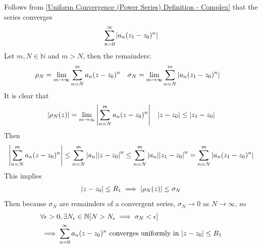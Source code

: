 \documentclass[12pt, english]{book}
\makeatletter
\renewenvironment{proof}[1][\proofname]{\par
	\pushQED{\qed}%
	\normalfont \topsep6\p@\@plus6\p@\relax
	\list{}{%
		\settowidth{\leftmargin}{\itshape\proofname:\hskip\labelsep}%
		\setlength{\labelwidth}{0pt}%
		\setlength{\itemindent}{-\leftmargin}%
	}%
	\item[\hskip\labelsep\itshape#1\@addpunct{:}]\ignorespaces
	}{ \popQED\endlist\@endpefalse}
\makeatother
\begin{document}
	\begin{figure}[H]
		\centering
	\end{figure}
	
	\begin{proof}
		Follows from \cref{Uniform Convergence (Power Series) Definition - Complex} that the series converges
		\begin{align*}
			\sum_{n=0}^{\infty} \abs{a_n (z_1 - z_0)^n}
		\end{align*}
		Let \(m, N \in \mathbb{N}\) and \(m > N\), then the remainders: 
		\begin{align*}
			\rho_N &= \lim_{m \rightarrow \infty} \sum_{n=N}^{m} a_n (z-z_0)^n &
			\sigma_N &= \lim_{m \rightarrow \infty} \sum_{n=N}^{m} \abs{a_n (z_1 - z_0)^n}
		\end{align*}
		It is clear that 
		\begin{align*}
			\abs{\rho_N(z)} &= \lim_{m\rightarrow \infty} \abs{\sum_{n=N}^{m} a_n (z-z_0)^n}
				& \abs{z-z_0} \leq \abs{z_1 - z_0}
		\end{align*}
		Then 
		\begin{align*}
			\abs{\sum_{n=N}^{m} a_n (z-z_0)^n} 
			\leq \sum_{n=N}^{m} \abs{a_n} \abs{z-z_0}^n
			\leq \sum_{n=N}^{m} \abs{a_n} \abs{z_1 - z_0}^n
				= \sum_{n=N}^{m} \abs{a_n (z_1 - z_0)^n}
		\end{align*}
		This implies  
		\begin{align*}
			\abs{z-z_0} \leq R_1 \implies \abs{\rho_N (z)} \leq \sigma_N
		\end{align*}
		Then because \(\sigma_N\) are remainders of a convergent series, \(\sigma_N \rightarrow 0\) as \(N \rightarrow \infty\), so
		\begin{align*}
			&\forall \epsilon > 0, \exists N_\epsilon \in \mathbb{N} 
			[N>N_\epsilon \implies \sigma_N < \epsilon] \\
			&\implies \sum_{n=0}^{\infty} a_n (z-z_0)^n \text{ converges uniformly in } \abs{z-z_0}\leq R_1
		\end{align*}
	\end{proof}
	
\end{document}
